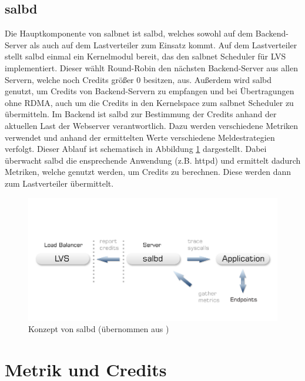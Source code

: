 \documentclass[a4paper, 12pt, BCOR10mm, DIV12, toc=bibliography, toc=listof, german]{scrbook}
\begin{document}

		\subsection*{salbd} %

			Die Hauptkomponente von salbnet ist salbd, welches sowohl auf dem Backend-Server als auch auf
			dem Lastverteiler zum Einsatz kommt. Auf dem Lastverteiler stellt salbd einmal ein Kernelmodul
			bereit, das den salbnet Scheduler für LVS implementiert. Dieser wählt Round-Robin den
			nächsten Backend-Server aus allen Servern, welche noch Credits größer 0 besitzen, aus. Außerdem
			wird salbd genutzt, um Credits von Backend-Servern zu empfangen und bei Übertragungen
			ohne RDMA, auch um die Credits in den Kernelspace zum salbnet Scheduler zu übermitteln.  Im
			Backend ist salbd zur Bestimmung der Credits anhand der aktuellen Last der Webserver
			verantwortlich. Dazu werden verschiedene Metriken verwendet und anhand der ermittelten Werte
			verschiedene Meldestrategien verfolgt. Dieser Ablauf ist schematisch in Abbildung
			\ref{fig:salbd} dargestellt. Dabei überwacht salbd die ensprechende Anwendung (z.B.
			httpd) und ermittelt dadurch Metriken, welche genutzt werden, um Credits zu berechnen. Diese
			werden dann zum Lastverteiler übermittelt.


		\begin{figure}
			\centering
			\includegraphics[width=\textwidth]{images/salbd-concept.png}
			\caption{Konzept von salbd (übernommen aus \cite{zinke2012})}
			\label{fig:salbd}
		\end{figure}

		\section{Metrik und Credits} %
		\label{sec:metrik}
\end{document}
